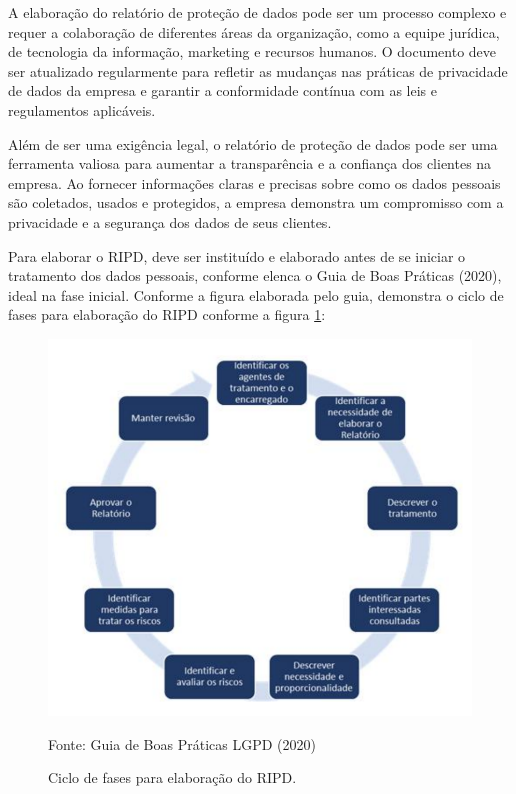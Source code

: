 \documentclass[
	12pt,				%
	openright,			%
	oneside,			%
	a4paper,			%
	english,			%
	french,				%
	spanish,			%
	brazil,				%
	]{abntex2}
\begin{document}
A elaboração do relatório de proteção de dados pode ser um processo complexo e requer a colaboração de diferentes áreas da organização, como a equipe jurídica, de tecnologia da informação, marketing e recursos humanos. O documento deve ser atualizado regularmente para refletir as mudanças nas práticas de privacidade de dados da empresa e garantir a conformidade contínua com as leis e regulamentos aplicáveis.

Além de ser uma exigência legal, o relatório de proteção de dados pode ser uma ferramenta valiosa para aumentar a transparência e a confiança dos clientes na empresa. Ao fornecer informações claras e precisas sobre como os dados pessoais são coletados, usados e protegidos, a empresa demonstra um compromisso com a privacidade e a segurança dos dados de seus clientes.

Para elaborar o RIPD, deve ser instituído e elaborado antes de se iniciar o tratamento dos dados pessoais, conforme elenca o Guia de Boas Práticas (2020), ideal na fase inicial. Conforme a figura elaborada pelo guia, demonstra o ciclo de fases para elaboração do RIPD conforme a figura \ref{fig: CicloRIPD }:
\begin{figure}[ht]
    \centering
    \caption{Ciclo de fases para elaboração do RIPD.}
    \includegraphics[width=6.5in]{Images/07CicloRIPD.png}
    \label{fig: CicloRIPD }
    
    \centering \small Fonte: Guia de Boas Práticas LGPD (2020)
\end{figure}
\end{document}
